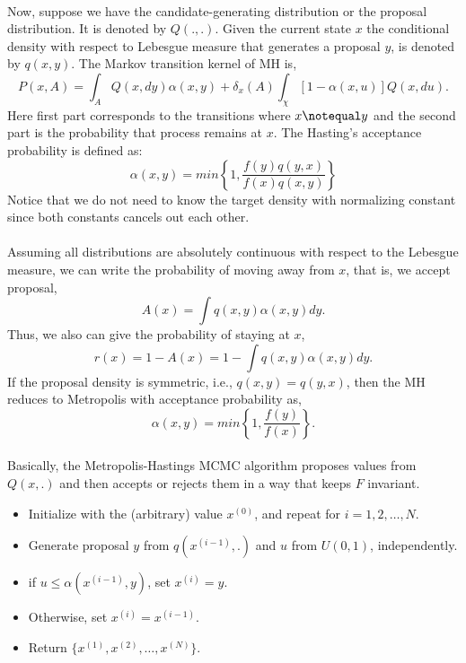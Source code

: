 \documentclass{article}
\begin{document}
\paragraph{}Now, suppose we have the candidate-generating distribution or the proposal distribution. It is denoted by $Q(.,.)$. Given the current state $x$ the conditional density with respect to Lebesgue measure that generates a proposal $y$, is denoted by $q(x,y)$. The Markov transition kernel of MH is,$$P(x,A)=\int_{A} Q(x,dy)\alpha(x,y) + \delta_x(A) \int_{\chi} [1-\alpha(x,u)]Q(x,du).$$
Here first part corresponds to the transitions where $x \notequal y$ and the second part is the probability that process remains at $x$. The Hasting’s acceptance probability is defined as:
\begin{equation*}
\alpha(x,y)=min\left\{1,\frac{f(y)q(y,x)}{f(x)q(x,y)}\right\}
\end{equation*}
Notice that we do not need to know the target density with normalizing constant since both constants cancels out each other.
\paragraph{}Assuming all distributions are absolutely continuous with respect to the
Lebesgue measure, we can write the probability of moving away from $x$, that is, we accept proposal,
\begin{equation*}
A(x)=\int q(x,y)\alpha(x,y) dy.
\end{equation*}
Thus, we also can give the probability of staying at $x$,
\begin{equation*}
r(x)=1-A(x)=1-\int q(x,y)\alpha(x,y) dy.
\end{equation*}
If the proposal density is symmetric, i.e., $q(x,y)=q(y,x)$, then the MH reduces to Metropolis with acceptance probability as,
\begin{equation*}
\alpha(x,y)=min\left\{1,\frac{f(y)}{f(x)}\right\}.
\end{equation*}
\paragraph{}Basically, the Metropolis-Hastings MCMC algorithm proposes values from $Q(x,.)$ and then accepts or rejects them in a way that keeps $F$ invariant.
\begin{tcolorbox}[colback=blue!5!white,colframe=blue,title=Metropolis-Hastings Algorithm]
\begin{itemize}
\item Initialize with the (arbitrary) value $x^{(0)}$, and repeat for $i=1,2,\ldots,N$.
\item Generate proposal $y$ from $q(x^{(i-1)},.)$ and $u$ from $U(0,1)$, independently.
\item if $u \leq \alpha(x^{(i-1)},y)$, set $x^{(i)}=y$.
\item Otherwise, set $x^{(i)}=x^{(i-1)}$.
\item Return $\{x^{(1)},x^{(2)},\ldots,x^{(N)}\}$.
\end{itemize}
\end{tcolorbox}
\end{document}
